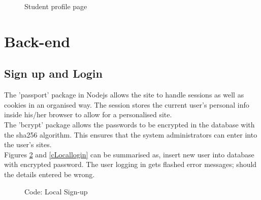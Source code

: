 \documentclass[a4paper,12pt]{article}
\numberwithin{equation}{section} %
\numberwithin{figure}{section}
\begin{document}
\begin{figure}[H]
\centering
{}
\caption{Student profile page}
\label{studentProfile}
\end{figure}

\pagebreak
\section{Back-end}
\subsection{Sign up and Login}
The 'passport' package in Nodejs allows the site to handle sessions as well as cookies in an organised way. The session stores the current user's personal info inside his/her browser to allow for a personalised site.\\
The 'bcrypt' package allows the passwords to be encrypted in the database with the sha256 algorithm. This ensures that the system administrators can enter into the user's sites.\\
Figures \ref{cLocalSignup} and \ref{cLocallogin} can be summarised as, insert new user into database with encrypted password. The user logging in gets flashed error messages; should the details entered be wrong.


\begin{figure}[H]
\centering
{}
\caption{Code: Local Sign-up}
\label{cLocalSignup}
\end{figure}
\end{document}
